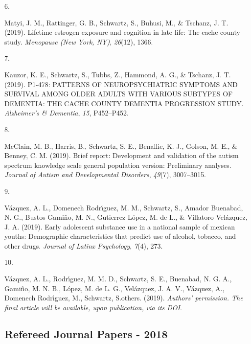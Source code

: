 \documentclass[11pt,a4paper,]{moderncv}
\newlength{\csllabelwidth}
\newcommand{\CSLLeftMargin}[1]{\parbox[t]{\csllabelwidth}{#1}}
\newcommand{\CSLRightInline}[1]{\parbox[t]{\linewidth - \csllabelwidth}{#1}}
\begin{document}
\leavevmode{}%
\CSLLeftMargin{6. }
\CSLRightInline{Matyi, J. M., Rattinger, G. B., Schwartz, S., Buhusi,
M., \& Tschanz, J. T. (2019). Lifetime estrogen exposure and cognition
in late life: The cache county study. \emph{Menopause (New York, NY)},
\emph{26}(12), 1366.}

\leavevmode{}%
\CSLLeftMargin{7. }
\CSLRightInline{Kauzor, K. E., Schwartz, S., Tubbs, Z., Hammond, A. G.,
\& Tschanz, J. T. (2019). P1-478: PATTERNS OF NEUROPSYCHIATRIC SYMPTOMS
AND SURVIVAL AMONG OLDER ADULTS WITH VARIOUS SUBTYPES OF DEMENTIA: THE
CACHE COUNTY DEMENTIA PROGRESSION STUDY. \emph{Alzheimer's \& Dementia},
\emph{15}, P452--P452.}

\leavevmode{}%
\CSLLeftMargin{8. }
\CSLRightInline{McClain, M. B., Harris, B., Schwartz, S. E., Benallie,
K. J., Golson, M. E., \& Benney, C. M. (2019). Brief report: Development
and validation of the autism spectrum knowledge scale general population
version: Preliminary analyses. \emph{Journal of Autism and Developmental
Disorders}, \emph{49}(7), 3007--3015.}

\leavevmode{}%
\CSLLeftMargin{9. }
\CSLRightInline{Vázquez, A. L., Domenech Rodrı́guez, M. M., Schwartz, S.,
Amador Buenabad, N. G., Bustos Gamiño, M. N., Gutierrez López, M. de L.,
\& Villatoro Velázquez, J. A. (2019). Early adolescent substance use in
a national sample of mexican youths: Demographic characteristics that
predict use of alcohol, tobacco, and other drugs. \emph{Journal of
Latinx Psychology}, \emph{7}(4), 273.}

\leavevmode{}%
\CSLLeftMargin{10. }
\CSLRightInline{Vázquez, A. L., Rodrı́guez, M. M. D., Schwartz, S. E.,
Buenabad, N. G. A., Gamiño, M. N. B., López, M. de L. G., Velázquez, J.
A. V., Vázquez, A., Domenech Rodrı́guez, M., Schwartz, S.others. (2019).
\emph{Authors' permission. The final article will be available, upon
publication, via its DOI}.}

\vspace{7mm}

\hypertarget{refereed-journal-papers---2018}{%
\subsection{\texorpdfstring{\textbf{Refereed Journal Papers -
2018}}{Refereed Journal Papers - 2018}}\label{refereed-journal-papers---2018}}
\end{document}

